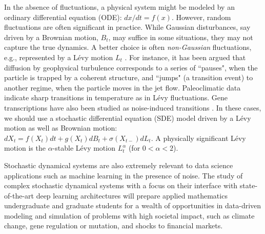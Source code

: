 \documentclass[11pt]{NSFamsart}
\begin{document}

In the absence of fluctuations, a physical system might be modeled by an  ordinary differential equation (ODE): $ dx/dt=f(x)$.  However, random fluctuations are often significant in practice. While Gaussian disturbances, say driven by a  Brownian motion, $B_t$, may suffice in some situations, they may not capture the true dynamics.  A better choice is often \emph{non-Gaussian} fluctuations, e.g., represented by a L\'evy motion $L_t$ \cite{Woy,Dit, Shlesinger,taqqu,dybiec2009levy}. For instance, it has been argued that diffusion by geophysical turbulence \cite{Shlesinger}
corresponds  to a series of  ``pauses", when the
particle is trapped by a coherent structure, and  
``jumps" (a transition event) to another regime, when the particle moves in the jet
flow. Paleoclimatic data \cite{Dit, ZhengYY2020}   indicate   sharp transitions in temperature as in L\'evy fluctuations. Gene transcriptions have also been studied as noise-induced transitions \cite{Raser2005,Suel06,Lin2016GeneED, ChenWuDuan}. 
In these cases, we should use a
 stochastic   differential equation (SDE)  model \cite{Arnold,   Oksendal, DuanBook2015, Applebaum}
 driven by a L\'evy motion as well as Brownian motion:
 $
 dX_t= f(X_t) dt + g(X_t) dB_t + \sigma(X_{t-}) dL_t.
 $
 A physically significant L\'evy motion is the  $\alpha$-stable L\'evy motion $L_t^\alpha$ (for $0<\alpha<2$).  
 
 
Stochastic dynamical systems are also extremely relevant to data science applications such as machine learning in the presence of  noise. 
The study of complex stochastic dynamical systems with a focus on their interface with state-of-the-art deep learning architectures will prepare applied mathematics undergraduate and graduate students for a wealth of opportunities in data-driven modeling and simulation of problems with high societal impact, such as climate change, gene regulation or mutation, and shocks to financial markets.
\end{document}
